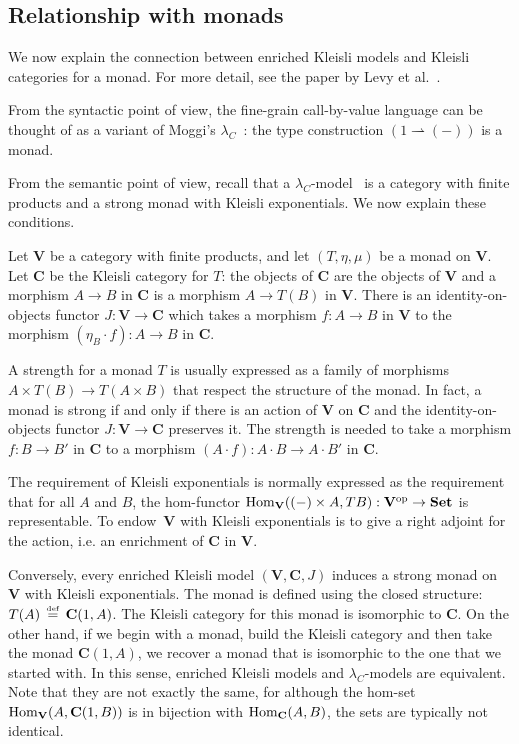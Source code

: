\documentclass{LMCS}
\newcommand{\pto}{\rightharpoonup}
\newcommand{\VCat}{\fixedcatfont{V}} \newcommand{\CCat}{\fixedcatfont{C}} \newcommand{\DCat}{\fixedcatfont{D}}
\newcommand{\ltensor}[2]{#1 \cdot #2}
\newcommand{\fixedcatfont}{\mathbf}
\newcommand{\Set}{\mathbf{Set}}
\newcommand{\opcat}[1]{#1^{\mathrm{op}}}
\newcommand{\defeq}{\mathrel{\,\stackrel{\mbox{\tiny{$\mathrm{def}$}}}=\,}}
\begin{document}
\subsection{Relationship with monads}
\label{sec:monads}
We now explain the connection between enriched Kleisli models 
and Kleisli categories for a monad.
For more detail, see the paper by Levy et al.~\cite{Levy:03}.

From the syntactic point of view, 
the fine-grain call-by-value language 
can be thought of as a variant of Moggi's $\lambda_C$~\cite{Moggi:89}:
the type construction $(1\pto(-))$ is a
monad.  

From the semantic point of view, 
recall that a $\lambda_C$-model~\cite{Moggi:89}
is a category with finite products and a strong monad 
with Kleisli exponentials. We now explain these conditions.

Let $\VCat$ be a category with finite products,
and let $(T,\eta,\mu)$ be a monad on $\VCat$.
Let $\CCat$ be the Kleisli category for $T$: the objects of $\CCat$ are 
the objects of $\VCat$ and a morphism $A\to B$ in $\CCat$ is a morphism
$A\to T(B)$ in $\VCat$. 
There is an identity-on-objects functor
$J\colon \VCat\to \CCat$ 
which takes a morphism $f\colon A\to B$ in $\VCat$
to the morphism $(\eta_B\cdot f):A\to B$ in $\CCat$.

A strength for a monad $T$ is usually expressed 
as a family of morphisms $A\times T(B)\to T(A\times B)$
that respect the structure of the monad.
In fact, a monad is strong if and only if 
there is an action of $\VCat$ on $\CCat$ and the
identity-on-objects functor $J\colon \VCat\to\CCat$ 
preserves it.
The strength is needed to 
take a morphism $f\colon B\to B'$ in $\CCat$
to  a morphism $(\ltensor A f):\ltensor A B\to \ltensor A{B'}$ 
in $\CCat$.

The requirement of Kleisli exponentials is normally 
expressed as the requirement that for all $A$ and $B$,
the hom-functor 
$\Homset{\VCat}{(-)\times A}{TB}:\opcat{\VCat}\to\Set$ is representable.
To endow~$\VCat$ with Kleisli exponentials is to 
give a right adjoint for the action,
i.e. an enrichment of $\CCat$ in $\VCat$.

Conversely, every enriched Kleisli model $(\VCat,\CCat,J)$ 
induces a strong monad on $\VCat$ with Kleisli exponentials.
The monad is defined using the closed structure:
$T(A)\defeq \CCat(1,A)$.
The Kleisli category for this monad is isomorphic to $\CCat$.
On the other hand, if we begin with a monad, build the Kleisli category
and then take the monad $\CCat(1,A)$, we recover a monad that is isomorphic
to the one that we started with. 
In this sense, enriched Kleisli models and $\lambda_C$-models are equivalent.
Note that they are not exactly the same,
for although the hom-set $\Homset{\VCat}{A}{\CCat(1,B)}$ is in bijection with
$\Homset{\CCat}{A}{B}$, the sets are typically not identical.
\end{document}
